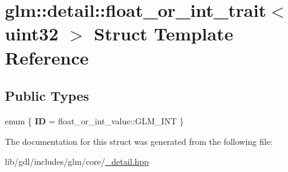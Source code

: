 \hypertarget{structglm_1_1detail_1_1float__or__int__trait_3_01uint32_01_4}{}\section{glm\+:\+:detail\+:\+:float\+\_\+or\+\_\+int\+\_\+trait$<$ uint32 $>$ Struct Template Reference}
\label{structglm_1_1detail_1_1float__or__int__trait_3_01uint32_01_4}
\subsection*{Public Types}
\begin{DoxyCompactItemize}
\item 
\hypertarget{structglm_1_1detail_1_1float__or__int__trait_3_01uint32_01_4_ae9d23c70745e1440a00955dc793a05ad}{}enum \{ {\bfseries I\+D} = float\+\_\+or\+\_\+int\+\_\+value\+:\+:G\+L\+M\+\_\+\+I\+N\+T
 \}\label{structglm_1_1detail_1_1float__or__int__trait_3_01uint32_01_4_ae9d23c70745e1440a00955dc793a05ad}

\end{DoxyCompactItemize}


The documentation for this struct was generated from the following file\+:\begin{DoxyCompactItemize}
\item 
lib/gdl/includes/glm/core/\hyperlink{__detail_8hpp}{\+\_\+detail.\+hpp}\end{DoxyCompactItemize}
